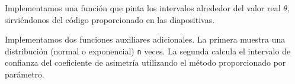 \documentclass[a4paper]{article}
\begin{document}
Implementamos una función que pinta los intervalos alrededor del valor
real \(\theta\), sirviéndonos del código proporcionado en las
diapositivas.

\begin{Shaded}
	\begin{Highlighting}[]
		\StringTok{ }
		\StringTok{ }
		\StringTok{ }\StringTok{ }\NormalTok{intervals[,}\NormalTok{],}
		\StringTok{ }\NormalTok{intervals[,}\NormalTok{],}
		 \OperatorTok{:}
		
		\StringTok{ }\OperatorTok{+}
		\StringTok{    }\NormalTok{(}\NormalTok{(}\OperatorTok{+}
		\StringTok{    }\NormalTok{(} \NormalTok{(}\NormalTok{, }\NormalTok{)) }\OperatorTok{+}
		\StringTok{    }\NormalTok{(}\NormalTok{(} \NormalTok{) }\OperatorTok{+}
		\StringTok{    }\NormalTok{() }\OperatorTok{+}
		\StringTok{    }\NormalTok{(} \NormalTok{, } \NormalTok{,}
		 \NormalTok{(}\NormalTok{))}
		\NormalTok{\}}
	\end{Highlighting}
\end{Shaded}

Implementamos dos funciones auxiliares adicionales. La primera muestra
una distribución (normal o exponencial) \texttt{n} veces. La segunda
calcula el intervalo de confianza del coeficiente de asimetría
utilizando el método proporcionado por parámetro.
\end{document}
